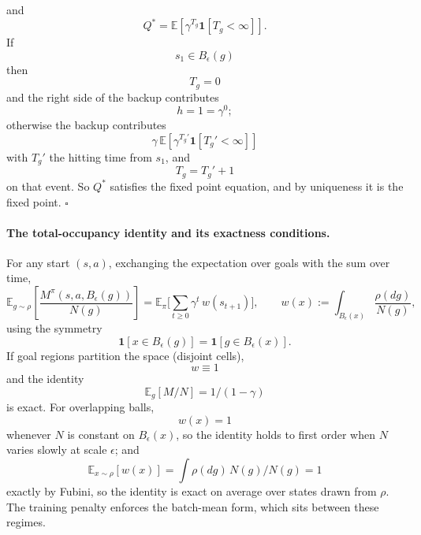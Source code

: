 \documentclass{article}
\newcommand{\E}{\mathbb{E}}
\newcommand{\ind}[1]{\mathbf{1}\!\left[#1\right]}
\begin{document}
and
\begin{equation}
Q^{*}=\E[\gamma^{T_g}\ind{T_g<\infty}].
\end{equation}
If
\begin{equation}
s_{1}\in B_\epsilon(g)
\end{equation}
then
\begin{equation}
T_g=0
\end{equation}
and the right side of the backup contributes
\begin{equation}
h=1=\gamma^{0};
\end{equation}
otherwise the backup contributes
\begin{equation}
\gamma\,\E[\gamma^{T_g'}\ind{T_g'<\infty}]
\end{equation}
with $T_g'$ the hitting time from $s_{1}$, and
\begin{equation}
T_g=T_g'+1
\end{equation}
on that event.
So $Q^{*}$ satisfies the fixed point equation, and by uniqueness it is the fixed point.
\hfill$\square$

\paragraph{The total-occupancy identity and its exactness conditions.}
For any start $(s,a)$, exchanging the expectation over goals with the sum over time,
\begin{equation*}
\E_{g\sim\rho}\!\left[\frac{M^{\pi}(s,a,B_\epsilon(g))}{N(g)}\right] =\E_{\pi}\Big[\sum_{t\ge0}\gamma^{t}\,w(s_{t+1})\Big], \qquad w(x):=\int_{B_\epsilon(x)}\frac{\rho(dg)}{N(g)},
\end{equation*}
using the symmetry
\begin{equation}
\ind{x\in B_\epsilon(g)}=\ind{g\in B_\epsilon(x)}.
\end{equation}
If goal regions partition the space (disjoint cells),
\begin{equation}
w\equiv1
\end{equation}
and the identity
\begin{equation}
\E_{g}[M/N]=1/(1-\gamma)
\end{equation}
is exact.
For overlapping balls,
\begin{equation}
w(x)=1
\end{equation}
whenever $N$ is constant on $B_\epsilon(x)$, so the identity holds to first order when $N$ varies slowly at scale $\epsilon$; and
\begin{equation}
\E_{x\sim\rho}[w(x)]=\int\rho(dg)\,N(g)/N(g)=1
\end{equation}
exactly by Fubini, so the identity is exact on average over states drawn from $\rho$.
The training penalty enforces the batch-mean form, which sits between these regimes.
\end{document}
